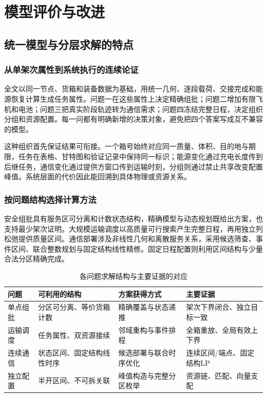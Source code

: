 \section{模型评价与改进}
\label{sec:evaluation}
\subsection{统一模型与分层求解的特点}
\subsubsection{从单架次属性到系统执行的连续论证}
全文以同一节点、货箱和装备数据为基础，用统一几何、逐段载荷、交接完成和能源恢复计算生成任务属性。问题一在这些属性上决定精确组批；问题二增加有限飞机和电池；问题三把真实阶段轨迹转为通信需求；问题四冻结完整日程，决定组织分组和资源配置。每一问都有明确新增的决策对象，避免把四个答案写成互不兼容的模型。

这种组织首先保证结果可衔接。一个箱号始终对应同一质量、体积、目的地与期限，任务在表格、甘特图和验证记录中保持同一标识；能源变化通过充电长度传到后继任务，通信变化通过提供方窗口传到运输时刻，分组则通过禁止共享改变配置峰值。系统层面的代价因此能回溯到具体物理或资源关系。

\subsubsection{按问题结构选择计算方法}
安全组批具有服务区可分离和计数状态结构，精确模型与动态规划既给出方案，也支持最少架次证明。大规模运输调度以高质量可行搜索产生完整日程，再用独立列松弛提供质量区间。通信部署涉及非线性几何和离散服务关系，采用候选筛查、事件区间、联合整数规划与固定结构线性精修。固定日程配置则利用区间结构与少量合法分区精确完成。

\begin{table}[htbp]\centering\small
\caption{各问题求解结构与主要证据的对应}\label{tab:evidence_levels}
\begin{tabularx}{\linewidth}{p{1.5cm}LLL}\toprule
问题 & 可利用的结构 & 方案获得方式 & 主要证据\\\midrule
单点组批 & 分区可分离、等价货箱计数 & 精确覆盖与状态递推 & 架次下界闭合、独立目标一致\\
运输调度 & 任务属性、双资源接续 & 邻域重构与事件排程 & 全箱重放、全局有效上下界\\
连续通信 & 状态区间、固定结构线性时序 & 候选部署与联合时序优化 & 连续区间/端点、固定结构LP\\
独立配置 & 半开区间、不可拆关联 & 峰值构造与完整分区枚举 & 资源链、匹配、向量支配\\\bottomrule
\end{tabularx}\end{table}

